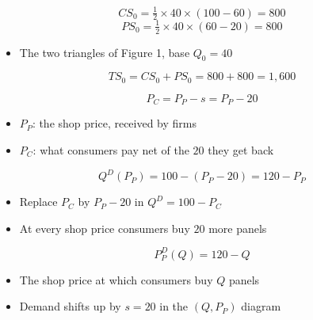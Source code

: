 \documentclass{beamer}
\begin{document}
\begin{frame}[plain,label=w3_wt2_welfare]
  \Large
  \[
    \tag{9}\;CS_0 = \tfrac{1}{2} \times 40 \times (100 - 60) = 800
  \]
  \[
    \tag{10}\;PS_0 = \tfrac{1}{2} \times 40 \times (60 - 20) = 800
  \]
  \vspace{0.3em}
  \begin{itemize}\Large
    \item The two triangles of Figure 1, base $Q_0 = 40$
  \end{itemize}
\end{frame}

\begin{frame}[plain,label=w3_wt2_ts]
  \Large
  \[
    \tag{11}\;TS_0 = CS_0 + PS_0 = 800 + 800 = 1{,}600
  \]
\end{frame}

\begin{frame}[plain,label=w3_cs_step1]
  \Large
  \[
    \tag{12}\;P_C = P_P - s = P_P - 20
  \]
  \vspace{0.3em}
  \begin{itemize}\Large
    \item $P_P$: the shop price, received by firms
    \item $P_C$: what consumers pay net of the $20$ they get back
  \end{itemize}
\end{frame}

\begin{frame}[plain,label=w3_cs_step2]
  \Large
  \[
    \tag{13}\;Q^D(P_P) = 100 - (P_P - 20) = 120 - P_P
  \]
  \vspace{0.3em}
  \begin{itemize}\Large
    \item Replace $P_C$ by $P_P - 20$ in $Q^D = 100 - P_C$
    \item At every shop price consumers buy $20$ more panels
  \end{itemize}
\end{frame}

\begin{frame}[plain,label=w3_cs_step3]
  \Large
  \[
    \tag{14}\;P_P^D(Q) = 120 - Q
  \]
  \vspace{0.3em}
  \begin{itemize}\Large
    \item The shop price at which consumers buy $Q$ panels
    \item Demand shifts up by $s = 20$ in the $(Q, P_P)$ diagram
  \end{itemize}
\end{frame}
\end{document}
